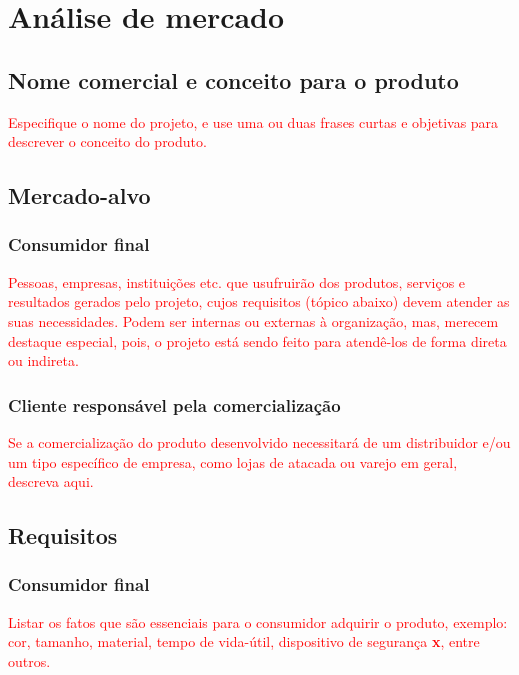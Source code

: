 \chapter{Análise de mercado}

\section{Nome comercial e conceito para o produto}

\textcolor{red}{Especifique o nome do projeto, e use uma ou duas frases curtas e objetivas para descrever o conceito do produto.}

\section{Mercado-alvo}

\subsection{Consumidor final}

\textcolor{red}{Pessoas, empresas, instituições etc. que usufruirão dos produtos, serviços e resultados gerados pelo projeto, cujos requisitos (tópico abaixo) devem atender as suas necessidades. Podem ser internas ou externas à organização, mas, merecem destaque especial, pois, o projeto está sendo feito para atendê-los de forma direta ou indireta.}

\subsection{Cliente responsável pela comercialização}

\textcolor{red}{Se a comercialização do produto desenvolvido necessitará de um distribuidor e/ou um tipo específico de empresa, como lojas de atacada ou varejo em geral, descreva aqui.}

\section{Requisitos}

\subsection{Consumidor final}

\textcolor{red}{Listar os fatos que são essenciais para o consumidor adquirir o produto, exemplo: cor, tamanho, material, tempo de vida-útil, dispositivo de segurança \textbf{x}, entre outros.}

